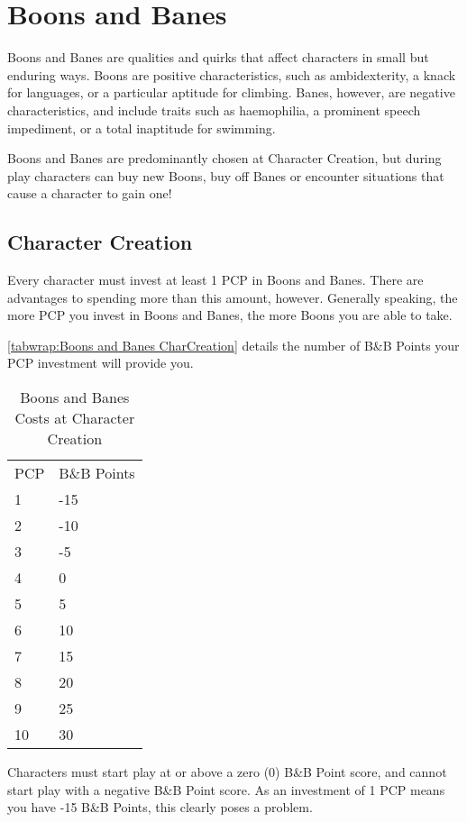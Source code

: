 \documentclass[oneside,11pt,english]{book}
\begin{document}
\chapter{Boons and Banes}\label{ch:boons}
\startcontents[chapters]
\clearpage
Boons and Banes are qualities and quirks that affect characters in small but enduring ways. Boons are 
positive characteristics, such as ambidexterity, a knack for languages, or a particular aptitude for 
climbing. Banes, however, are negative characteristics, and include traits such as haemophilia, a prominent speech impediment, or a total inaptitude for swimming. 

Boons and Banes are predominantly chosen at Character Creation, but during play characters can buy new 
Boons, buy off Banes or encounter situations that cause a character to gain one! 
\section{Character Creation}
Every character must invest at least 1 PCP in Boons and Banes. There are advantages to spending more 
than this amount, however. Generally speaking, the more PCP you invest in Boons and Banes, the more 
Boons you are able to take. 

\autoref{tabwrap:Boons and Banes CharCreation} details the number of B\&B Points your PCP investment will provide you. 

\begin{wraptable}{r}{5cm}
	\caption{Boons and Banes Costs at Character Creation}
	\label{tabwrap:Boons and Banes CharCreation}
	\begin{tabu}{X[c]X[c]}
		PCP&B\&B Points\\
		1&-15\\
		2&-10\\
		3&-5\\
		4&0\\
		5&5\\
		6&10\\
		7&15\\
		8&20\\
		9&25\\
		10&30\\
	\end{tabu}
\end{wraptable}
Characters must start play at or above a zero (0) B\&B Point score, and cannot start play with a negative 
B\&B Point score. As an investment of 1 PCP means you have -15 B\&B Points, this clearly poses a 
problem. 
\end{document}
